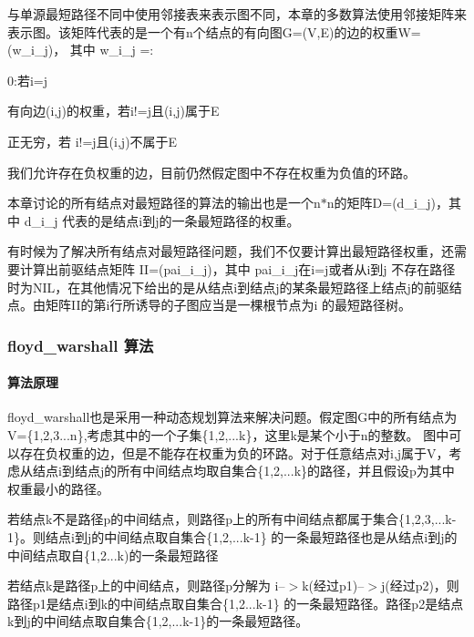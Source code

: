 与单源最短路径不同中使用邻接表来表示图不同，本章的多数算法使用邻接矩阵来表示图。该矩阵代表的是一个有n个结点的有向图\+G=(V,E)的边的权重\+W=(w\+\_\+i\+\_\+j)， 其中 w\+\_\+i\+\_\+j =\+:


\begin{DoxyItemize}
\item 0\+:若i=j
\item 有向边(i,j)的权重，若i!=j且(i,j)属于\+E
\item 正无穷，若 i!=j且(i,j)不属于\+E
\end{DoxyItemize}

我们允许存在负权重的边，目前仍然假定图中不存在权重为负值的环路。

本章讨论的所有结点对最短路径的算法的输出也是一个n$\ast$n的矩阵\+D=(d\+\_\+i\+\_\+j)，其中 d\+\_\+i\+\_\+j 代表的是结点i到j的一条最短路径的权重。

有时候为了解决所有结点对最短路径问题，我们不仅要计算出最短路径权重，还需要计算出前驱结点矩阵 I\+I=(pai\+\_\+i\+\_\+j)，其中 pai\+\_\+i\+\_\+j在i=j或者从i到j 不存在路径时为\+N\+I\+L，在其他情况下给出的是从结点i到结点j的某条最短路径上结点j的前驱结点。由矩阵\+I\+I的第i行所诱导的子图应当是一棵根节点为i 的最短路径树。

\subsubsection*{floyd\+\_\+warshall 算法}

\paragraph*{算法原理}

floyd\+\_\+warshall也是采用一种动态规划算法来解决问题。假定图\+G中的所有结点为\+V=\{1,2,3...n\},考虑其中的一个子集\{1,2,...k\}，这里k是某个小于n的整数。 图中可以存在负权重的边，但是不能存在权重为负的环路。对于任意结点对i,j属于\+V，考虑从结点i到结点j的所有中间结点均取自集合\{1,2,...k\}的路径，并且假设p为其中权重最小的路径。


\begin{DoxyItemize}
\item 若结点k不是路径p的中间结点，则路径p上的所有中间结点都属于集合\{1,2,3,...k-\/1\}。则结点i到j的中间结点取自集合\{1,2,...k-\/1\} 的一条最短路径也是从结点i到j的中间结点取自\{1,2...k)的一条最短路径
\item 若结点k是路径p上的中间结点，则路径p分解为 i--$>$k(经过p1)--$>$j(经过p2)，则路径p1是结点i到k的中间结点取自集合\{1,2...k-\/1\} 的一条最短路径。路径p2是结点k到j的中间结点取自集合\{1,2,...k-\/1\}的一条最短路径。
\end{DoxyItemize}

